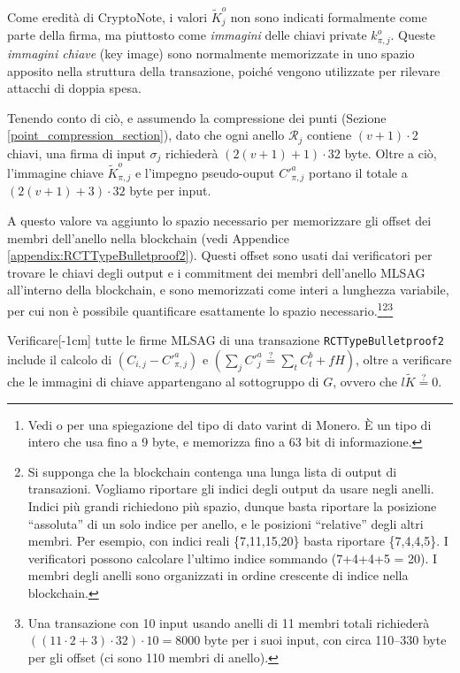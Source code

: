 Come eredità di CryptoNote, i valori \(\tilde{K}^o_j\) non sono indicati formalmente come parte della firma, ma piuttosto come {\em immagini} delle chiavi private $k^o_{\pi,j}$. Queste {\em immagini chiave} (key image) sono normalmente memorizzate in uno spazio apposito nella struttura della transazione, poiché vengono utilizzate per rilevare attacchi di doppia spesa.

Tenendo conto di ciò, e assumendo la compressione dei punti (Sezione \ref{point_compression_section}), dato che ogni anello \(\mathcal{R}_j\) contiene \((v+1) \cdot 2\) chiavi, una firma di input $\sigma_j$ richiederà \( (2(v+1) + 1) \cdot 32  \) byte. Oltre a ciò, l'immagine chiave $\tilde{K}^o_{\pi,j}$ e l'impegno pseudo-ouput $C'^a_{\pi,j}$ portano il totale a $(2(v+1)+3) \cdot 32$ byte per input.

A questo valore va aggiunto lo spazio necessario per memorizzare gli offset dei membri dell’anello nella blockchain (vedi Appendice \ref{appendix:RCTTypeBulletproof2}). Questi offset sono usati dai verificatori per trovare le chiavi degli output e i commitment dei membri dell’anello MLSAG all’interno della blockchain, e sono memorizzati come interi a lunghezza variabile, per cui non è possibile quantificare esattamente lo spazio necessario.\footnote{Vedi \cite{varint-description} o \cite{varint-spec} per una spiegazione del tipo di dato varint di Monero. È un tipo di intero che usa fino a 9 byte, e memorizza fino a 63 bit di informazione.}\footnote{Si supponga che la blockchain contenga una lunga lista di output di transazioni. Vogliamo riportare gli indici degli output da usare negli anelli. Indici più grandi richiedono più spazio, dunque basta riportare la posizione “assoluta” di un solo indice per anello, e le posizioni “relative” degli altri membri. Per esempio, con indici reali \{7,11,15,20\} basta riportare \{7,4,4,5\}. I verificatori possono calcolare l’ultimo indice sommando (7+4+4+5 = 20). I membri degli anelli sono organizzati in ordine crescente di indice nella blockchain.}\footnote{Una transazione con 10 input usando anelli di 11 membri totali richiederà \(((11 \cdot 2 + 3) \cdot 32) \cdot 10 = 8000 \) byte per i suoi input, con circa 110–330 byte per gli offset (ci sono 110 membri di anello).}%

Verificare[-1cm] tutte le firme MLSAG di una transazione {\tt RCTTypeBulletproof2} include il calcolo di \( (C_{i, j} - C'^a_{\pi, j}) \) e \( (\sum_j C'^a_{j} \stackrel{?}{=} \sum_t C^b_{t} + f H)\), oltre a verificare che le immagini di chiave appartengano al sottogruppo di $G$, ovvero che $l \tilde{K} \stackrel{?}{=} 0$.

